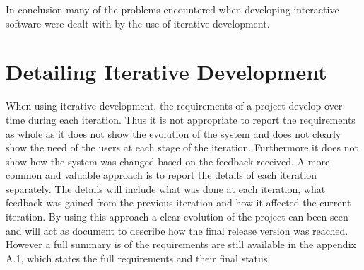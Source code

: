 \documentclass[a4paper,oneside,11pt]{report}
\begin{document}
In conclusion many of the problems  encountered when developing interactive software were dealt with by the use of iterative development. 
\pagebreak
\section{Detailing Iterative Development}
When using iterative development, the requirements of a project develop over time during each iteration. Thus it is not appropriate to report the requirements as whole as it does not show the evolution of the system and does not clearly show the need of the users at each stage of the iteration. Furthermore it does not show how the system was changed based on the feedback received. A more common and valuable approach is to report the details of each iteration separately. The details will include what was done at each iteration, what feedback was gained from the previous iteration and how it affected the current iteration. By using this approach a clear evolution of the project can been seen and will act as document to describe how the final release version was reached. However a full summary is of the requirements are still available in the appendix A.1, which states the full requirements and their final status.
 
\end{document}
